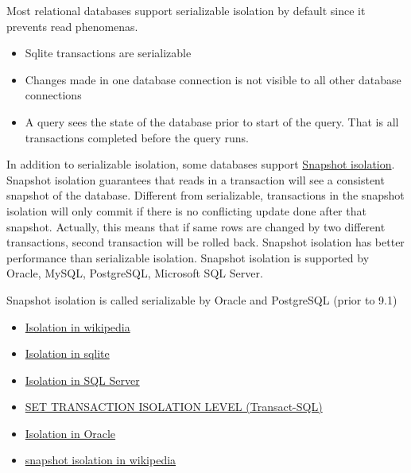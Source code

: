 \documentclass[
  letterpaper,
  DIV=11,
  numbers=noendperiod]{scrreprt}
\providecommand{\tightlist}{%
  \setlength{\itemsep}{0pt}\setlength{\parskip}{0pt}}\usepackage{longtable,booktabs,array}
\begin{document}
Most relational databases support serializable isolation by default
since it prevents read phenomenas.

\begin{itemize}
\tightlist
\item
  Sqlite transactions are serializable
\item
  Changes made in one database connection is not visible to all other
  database connections
\item
  A query sees the state of the database prior to start of the query.
  That is all transactions completed before the query runs.
\end{itemize}

In addition to serializable isolation, some databases support
\href{https://en.wikipedia.org/wiki/Snapshot_isolation}{Snapshot
isolation}. Snapshot isolation guarantees that reads in a transaction
will see a consistent snapshot of the database. Different from
serializable, transactions in the snapshot isolation will only commit if
there is no conflicting update done after that snapshot. Actually, this
means that if same rows are changed by two different transactions,
second transaction will be rolled back. Snapshot isolation has better
performance than serializable isolation. Snapshot isolation is supported
by Oracle, MySQL, PostgreSQL, Microsoft SQL Server.

\begin{tcolorbox}[enhanced jigsaw, titlerule=0mm, colback=white, colbacktitle=quarto-callout-caution-color!10!white, toprule=.15mm, coltitle=black, opacitybacktitle=0.6, left=2mm, leftrule=.75mm, arc=.35mm, title=\textcolor{quarto-callout-caution-color}{\faFire}\hspace{0.5em}{Caution}, breakable, colframe=quarto-callout-caution-color-frame, bottomtitle=1mm, rightrule=.15mm, toptitle=1mm, opacityback=0, bottomrule=.15mm]

Snapshot isolation is called serializable by Oracle and PostgreSQL
(prior to 9.1)

\end{tcolorbox}

\begin{itemize}
\tightlist
\item
  \href{https://en.wikipedia.org/wiki/Isolation_\%28database_systems\%29}{Isolation
  in wikipedia}
\item
  \href{https://sqlite.org/isolation.html}{Isolation in sqlite}
\item
  \href{https://learn.microsoft.com/en-us/sql/t-sql/language-elements/transaction-isolation-levels?view=sql-server-ver16}{Isolation
  in SQL Server}
\item
  \href{https://learn.microsoft.com/en-us/sql/t-sql/statements/set-transaction-isolation-level-transact-sql?view=sql-server-ver16}{SET
  TRANSACTION ISOLATION LEVEL (Transact-SQL)}
\item
  \href{https://docs.oracle.com/en/database/oracle/oracle-database/19/cncpt/data-concurrency-and-consistency.html\#GUID-4BD4DFD6-DAEA-41B2-BB56-7135568F0548}{Isolation
  in Oracle}
\item
  \href{https://en.wikipedia.org/wiki/Snapshot_isolation}{snapshot
  isolation in wikipedia}
\end{itemize}
\end{document}
